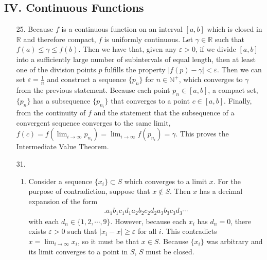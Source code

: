\documentclass[a4paper,12pt]{article}
\begin{document}
    \subsection*{IV. Continuous Functions}
    \begin{enumerate}
        \item[25.]
            Because $f$ is a continuous function on an interval $[a, b]$ which is closed in $\mathbb{R}$ and therefore compact, $f$ is uniformly continuous. Let $\gamma \in \mathbb{R}$ such that $f(a) \leq \gamma \leq f(b)$. Then we have that, given any $\varepsilon > 0$, if we divide $[a, b]$ into a sufficiently large number of subintervals of equal length, then at least one of the division points $p$ fulfills the property $|f(p) - \gamma| < \varepsilon$. Then we can set $\varepsilon = \frac{1}{n}$ and construct a sequence $\{ p_n \}$ for $n \in \mathbb{N}^+$, which converges to $\gamma$ from the previous statement. Because each point $p_n \in [a, b]$, a compact set, $\{ p_n \}$ has a subsequence $\{ p_{n_i} \}$ that converges to a point $c \in [a, b]$. Finally, from the continuity of $f$ and the statement that the subsequence of a convergent sequence converges to the same limit, $f(c) = f \left( \lim_{i \to \infty} p_{n_i} \right) = \lim_{i \to \infty} f(p_{n_i}) = \gamma$. This proves the Intermediate Value Theorem.

        \item[31.]
            \begin{enumerate}
                \item
                    \iffalse
                    The complement $S^c$ in $[0, 1]$ consists of all numbers having decimal expansions of the form
                    \begin{align*}
                        .a_1 b_1 c_1 d_1 a_2 b_2 c_2 d_2 a_3 b_3 c_3 d_3 \cdots
                    \end{align*}
                    with each $d_n \in \{ 1, 2, \cdots, 9 \}$. $S^c$ is open because for any $x \in S^c$, 
                    \fi
                    Consider a sequence $\{ x_i \} \subset S$ which converges to a limit $x$. For the purpose of contradiction, suppose that $x \notin S$. Then $x$ has a decimal expansion of the form
                    \begin{align*}
                        .a_1 b_1 c_1 d_1 a_2 b_2 c_2 d_2 a_3 b_3 c_3 d_3 \cdots
                    \end{align*}
                    with each $d_n \in \{ 1, 2, \cdots, 9 \}$. However, because each $x_i$ has $d_n = 0$, there exists $\varepsilon > 0$ such that $|x_i - x| \geq \varepsilon$ for all $i$. This contradicts $x = \lim_{i \to \infty} x_i$, so it must be that $x \in S$. Because $\{ x_i \}$ was arbitrary and its limit converges to a point in $S$, $S$ must be closed.


\end{enumerate}
\end{enumerate}
\end{document}
